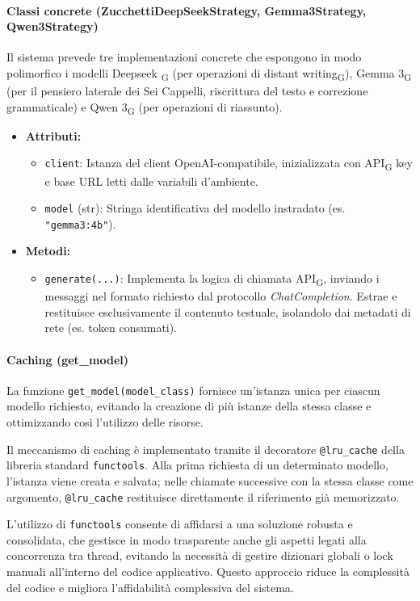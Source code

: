 \documentclass[11pt,a4paper]{article}
\newcommand{\gls}[1]{#1\textsubscript{G}}
\begin{document}
\paragraph{Classi concrete (ZucchettiDeepSeekStrategy, Gemma3Strategy, Qwen3Strategy)}
Il sistema prevede tre implementazioni concrete che espongono in modo polimorfico i modelli \gls{Deepseek } (per operazioni di \gls{distant writing}),  \gls{Gemma 3} (per il pensiero laterale dei Sei Cappelli, riscrittura del testo e correzione grammaticale) e \gls{Qwen 3} (per operazioni di riassunto).
\begin{itemize}
    \item \textbf{Attributi:}
\begin{itemize}
    \item \texttt{client}: Istanza del client OpenAI-compatibile, inizializzata con \gls{API} key e base URL letti dalle variabili d'ambiente.
    \item \texttt{model} (str): Stringa identificativa del modello instradato (es. \texttt{"gemma3:4b"}).
\end{itemize}
    \item \textbf{Metodi:}
\begin{itemize}
    \item \texttt{generate(...)}: Implementa la logica di chiamata \gls{API}, inviando i messaggi nel formato richiesto dal protocollo \textit{ChatCompletion}. Estrae e restituisce esclusivamente il contenuto testuale, isolandolo dai metadati di rete (es. token consumati).
\end{itemize}
\end{itemize}

\paragraph{Caching (get\_model)}
La funzione \texttt{get\_model(model\_class)} fornisce un’istanza unica per ciascun modello richiesto, evitando la creazione di più istanze della stessa classe e ottimizzando così l’utilizzo delle risorse.

Il meccanismo di caching è implementato tramite il decoratore \texttt{@lru\_cache} della libreria standard \texttt{functools}. Alla prima richiesta di un determinato modello, l’istanza viene creata e salvata; nelle chiamate successive con la stessa classe come argomento, \texttt{@lru\_cache} restituisce direttamente il riferimento già memorizzato.

L’utilizzo di \texttt{functools} consente di affidarsi a una soluzione robusta e consolidata, che gestisce in modo trasparente anche gli aspetti legati alla concorrenza tra thread, evitando la necessità di gestire dizionari globali o lock manuali all'interno del codice applicativo. Questo approccio riduce la complessità del codice e migliora l’affidabilità complessiva del sistema.
\end{document}
